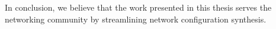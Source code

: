 \documentclass{uiucthesis2021}
\newcounter{counterforappendices}
\begin{document}
\noindent In conclusion, we believe that the work presented in this thesis serves the networking community by streamlining network configuration synthesis.\\




\backmatter

\printbibliography

% 
\end{document}
